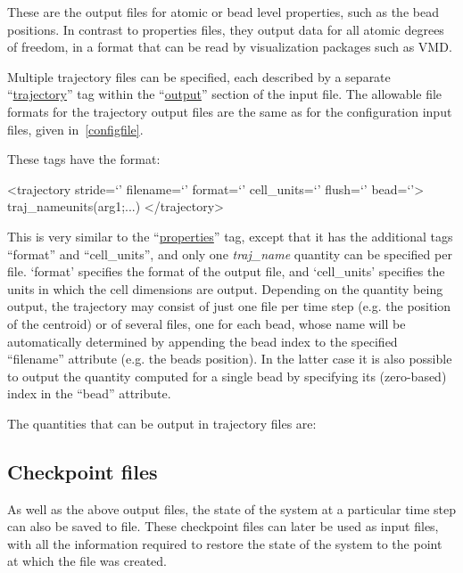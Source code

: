 \documentclass[11pt,english,fleqn]{report}
\newenvironment{code}{%
\footnotesize
\verbatim
}{
\endverbatim
\normalsize
}
\begin{document}
These are the output files for atomic or bead level properties, such
as the bead positions. In contrast to properties files, they output data for
all atomic degrees of freedom, in a format that can be read by visualization packages
such as VMD.

Multiple trajectory files can be specified, each described by a separate
{}``\hyperref[TRAJECTORY]{trajectory}'' tag within the
``\hyperref[OUTPUTS]{output}'' section of the input file.
The allowable file formats for the trajectory output files are the same as for the configuration
input files, given in~\ref{configfile}.

These tags have the format:

\begin{code}
<trajectory stride=`' filename=`' format=`' cell_units=`' flush=`' bead=`'>
   traj_name{units}(arg1;...)
</trajectory>
\end{code}

This is very similar to the
{}``\hyperref[PROPERTIES]{properties}'' tag, except that it has the
additional tags {}``format'' and {}``cell\_units'', and only one
\emph{traj\_name} quantity can be specified per file. `format' specifies the format
of the output file, and `cell\_units' specifies the units in which
the cell dimensions are output.
Depending on the quantity being output, the trajectory may consist of just
one file per time step (e.g. the position of the centroid) or of several files,
one for each bead, whose name will be automatically determined by
appending the bead index to the specified  {}``filename'' attribute (e.g.
the beads position).
In the latter case it is also possible to output the quantity computed
for a single bead by specifying its (zero-based) index in the {}``bead'' attribute.

The quantities that can be output in trajectory files are:




\subsection{Checkpoint files}

\label{checkpoint}

As well as the above output files, the state of the system at a particular
time step can also be saved to file. These checkpoint files can later be
used as input files, with all the information required to restore
the state of the system to the point at which the file was created.
\end{document}
